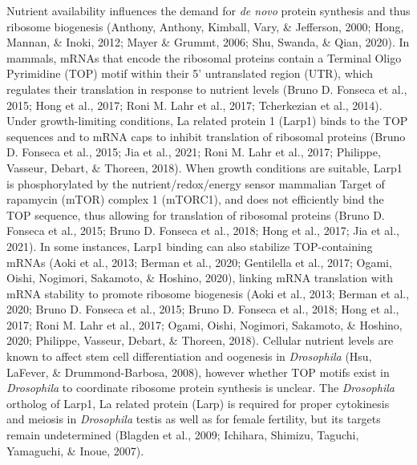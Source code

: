 \documentclass[12pt,oneside]{reedthesis}
\begin{document}
Nutrient availability influences the demand for \emph{de novo} protein synthesis and thus ribosome biogenesis (Anthony, Anthony, Kimball, Vary, \& Jefferson, 2000; Hong, Mannan, \& Inoki, 2012; Mayer \& Grummt, 2006; Shu, Swanda, \& Qian, 2020). In mammals, mRNAs that encode the ribosomal proteins contain a Terminal Oligo Pyrimidine (TOP) motif within their 5' untranslated region (UTR), which regulates their translation in response to nutrient levels (Bruno D. Fonseca et al., 2015; Hong et al., 2017; Roni M. Lahr et al., 2017; Tcherkezian et al., 2014). Under growth-limiting conditions, La related protein 1 (Larp1) binds to the TOP sequences and to mRNA caps to inhibit translation of ribosomal proteins (Bruno D. Fonseca et al., 2015; Jia et al., 2021; Roni M. Lahr et al., 2017; Philippe, Vasseur, Debart, \& Thoreen, 2018). When growth conditions are suitable, Larp1 is phosphorylated by the nutrient/redox/energy sensor mammalian Target of rapamycin (mTOR) complex 1 (mTORC1), and does not efficiently bind the TOP sequence, thus allowing for translation of ribosomal proteins (Bruno D. Fonseca et al., 2015; Bruno D. Fonseca et al., 2018; Hong et al., 2017; Jia et al., 2021). In some instances, Larp1 binding can also stabilize TOP-containing mRNAs (Aoki et al., 2013; Berman et al., 2020; Gentilella et al., 2017; Ogami, Oishi, Nogimori, Sakamoto, \& Hoshino, 2020), linking mRNA translation with mRNA stability to promote ribosome biogenesis (Aoki et al., 2013; Berman et al., 2020; Bruno D. Fonseca et al., 2015; Bruno D. Fonseca et al., 2018; Hong et al., 2017; Roni M. Lahr et al., 2017; Ogami, Oishi, Nogimori, Sakamoto, \& Hoshino, 2020; Philippe, Vasseur, Debart, \& Thoreen, 2018). Cellular nutrient levels are known to affect stem cell differentiation and oogenesis in \emph{Drosophila} (Hsu, LaFever, \& Drummond-Barbosa, 2008), however whether TOP motifs exist in \emph{Drosophila} to coordinate ribosome protein synthesis is unclear. The \emph{Drosophila} ortholog of Larp1, La related protein (Larp) is required for proper cytokinesis and meiosis in \emph{Drosophila} testis as well as for female fertility, but its targets remain undetermined (Blagden et al., 2009; Ichihara, Shimizu, Taguchi, Yamaguchi, \& Inoue, 2007).
\end{document}
